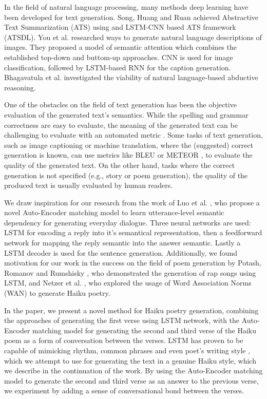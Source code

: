\documentclass{acm_proc_article-sp}
\begin{document}
In the field of natural language processing, many methods deep learning have been developed for text generation. Song, Huang and Ruan \cite{song2019abstractive} achieved Abstractive Text Summarization (ATS) using and LSTM-CNN based ATS framework (ATSDL). You et al. \cite{You_2016_CVPR} researched ways to generate natural language descriptions of images. They proposed a model of semantic attention which combines the established top-down and buttom-up approaches. CNN is used for image classification, followed by LSTM-based RNN for the caption generation. Bhagavatula et al. \cite{bhagavatula2020abductive} investigated the viability of natural language-based abductive reasoning.

One of the obstacles on the field of text generation has been the objective evaluation of the generated text's semantics. While the spelling and grammar correctness are easy to evaluate, the meaning of the generated text can be challenging to evaluate with an automated metric \cite{celikyilmaz2020evaluation}. Some tasks of text generation, such as image captioning or machine translation, where the (suggested) correct generation is known, can use metrics like BLEU \cite{papineni2002bleu} or METEOR \cite{banerjee2005meteor}, to evaluate the quality of the generated text. On the other hand, tasks where the correct generation is not specified (e.g., story \cite{pawade2018story} or poem \cite{zhang2014chinese} generation), the quality of the produced text is usually evaluated by human readers.

We draw inspiration for our research from the work of Luo et al. \cite{luo2018autoencoder}, who propose a novel Auto-Encoder matching model to learn utterance-level semantic dependency for generating everyday dialogue. Three neural networks are used: LSTM for encoding a reply into it's semantical representation, then a feedforward network for mapping the reply semantic into the answer semantic. Lastly a LSTM decoder is used for the sentence generation. Additionally, we found motivation for our work in the success on the field of poem generation by Potash, Romanov and Rumshisky \cite{potash2015ghostwriter}, who demonstrated the generation of rap songs using LSTM, and Netzer et al. \cite{netzer2009gaiku}, who explored the usage of Word Association Norms (WAN) to generate Haiku poetry.

In the paper, we present a novel method for Haiku poetry generation, combining the approaches of generating the first verse using LSTM network, with the Auto-Encoder matching model \cite{luo2018autoencoder} for generating the second and third verse of the Haiku poem as a form of conversation between the verses. LSTM has proven to be capable of mimicking rhythm, common phrases and even poet's writing style \cite{potash2015ghostwriter}, which we attempt to use for generating the text in a genuine Haiku style, which we describe in the continuation of the work. By using the Auto-Encoder matching model to generate the second and third verse as an answer to the previous verse, we experiment by adding a sense of conversational bond between the verses.
\end{document}
